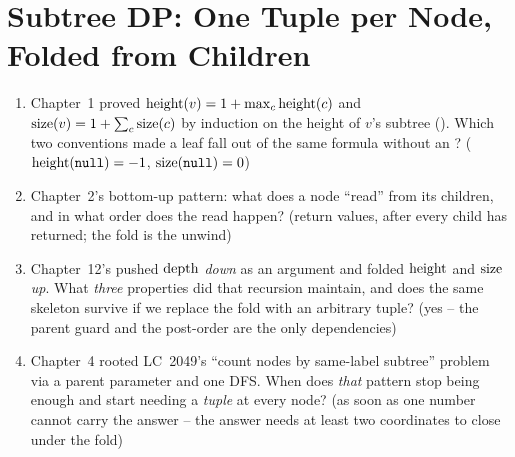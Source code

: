 \section{Subtree DP: One Tuple per Node, Folded from Children}\label{sec:c10-subtrees}

\begin{previouslybox}
\begin{enumerate}[nosep, leftmargin=1.6em]
  \item Chapter~1 proved $\operatorname{height}(v)=1+\max_c\operatorname{height}(c)$ and
        $\operatorname{size}(v)=1+\sum_c\operatorname{size}(c)$ by induction on the height of $v$'s
        subtree (). Which two conventions made
        a leaf fall out of the same formula without an ?
        ($\operatorname{height}(\texttt{null})=-1$, $\operatorname{size}(\texttt{null})=0$)
  \item Chapter~2's bottom-up pattern: what does a node ``read'' from its
        children, and in what order does the read happen?
        (return values, after every child has returned; the fold is the
        unwind)
  \item Chapter~12's  pushed $\operatorname{depth}$ \emph{down} as an
        argument and folded $\operatorname{height}$ and $\operatorname{size}$ \emph{up}. What
        \emph{three} properties did that recursion maintain, and does the
        same skeleton survive if we replace the fold with an arbitrary
        tuple? (yes -- the parent guard and the post-order are the only
        dependencies)
  \item Chapter~4 rooted LC~2049's ``count nodes by same-label subtree''
        problem via a parent parameter and one DFS. When does \emph{that}
        pattern stop being enough and start needing a \emph{tuple} at every
        node? (as soon as one number cannot carry the answer -- the answer
        needs at least two coordinates to close under the fold)
\end{enumerate}
\end{previouslybox}

